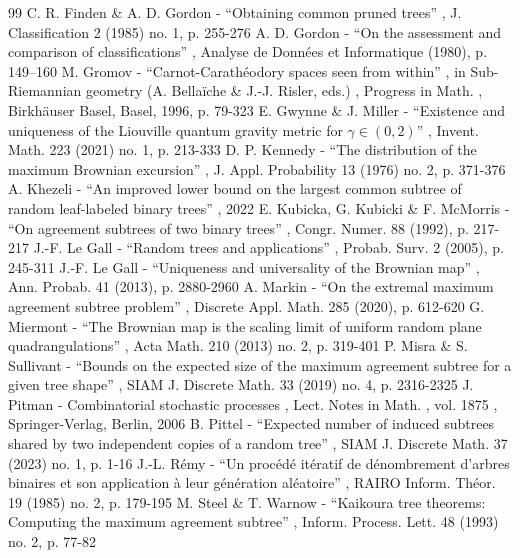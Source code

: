 \documentclass[11pt]{article}
\theoremstyle{plain}
\theoremstyle{definition}
\numberwithin{equation}{section}
\begin{document}
\begin{thebibliography}{99}
 C. R. Finden \& A. D. Gordon - “Obtaining common pruned trees” , J. Classification 2 (1985) no. 1, p. 255-276
 A. D. Gordon - “On the assessment and comparison of classifications” , Analyse de Données et Informatique (1980), p. 149–160
 M. Gromov - “Carnot-Carathéodory spaces seen from within” , in Sub-Riemannian geometry (A. Bellaïche \& J.-J. Risler, eds.) , Progress in Math. , Birkhäuser Basel, Basel, 1996, p. 79-323
 E. Gwynne \& J. Miller - “Existence and uniqueness of the Liouville quantum gravity metric for $\gamma \in (0,2)$” , Invent. Math. 223 (2021) no. 1, p. 213-333
 D. P. Kennedy - “The distribution of the maximum Brownian excursion” , J. Appl. Probability 13 (1976) no. 2, p. 371-376
 A. Khezeli - “An improved lower bound on the largest common subtree of random leaf-labeled binary trees” , 2022
 E. Kubicka, G. Kubicki \& F. McMorris - “On agreement subtrees of two binary trees” , Congr. Numer. 88 (1992), p. 217-217
 J.-F. Le Gall - “Random trees and applications” , Probab. Surv. 2 (2005), p. 245-311
 J.-F. Le Gall - “Uniqueness and universality of the Brownian map” , Ann. Probab. 41 (2013), p. 2880-2960
 A. Markin - “On the extremal maximum agreement subtree problem” , Discrete Appl. Math. 285 (2020), p. 612-620
 G. Miermont - “The Brownian map is the scaling limit of uniform random plane quadrangulations” , Acta Math. 210 (2013) no. 2, p. 319-401
 P. Misra \& S. Sullivant - “Bounds on the expected size of the maximum agreement subtree for a given tree shape” , SIAM J. Discrete Math. 33 (2019) no. 4, p. 2316-2325
 J. Pitman - Combinatorial stochastic processes , Lect. Notes in Math. , vol. 1875 , Springer-Verlag, Berlin, 2006
 B. Pittel - “Expected number of induced subtrees shared by two independent copies of a random tree” , SIAM J. Discrete Math. 37 (2023) no. 1, p. 1-16
 J.-L. Rémy - “Un procédé itératif de dénombrement d’arbres binaires et son application à leur génération aléatoire” , RAIRO Inform. Théor. 19 (1985) no. 2, p. 179-195
 M. Steel \& T. Warnow - “Kaikoura tree theorems: Computing the maximum agreement subtree” , Inform. Process. Lett. 48 (1993) no. 2, p. 77-82
\end{thebibliography}
\end{document}
